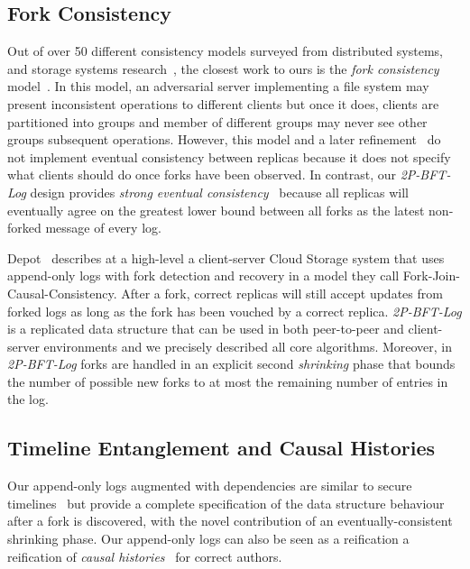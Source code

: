 \documentclass[9pt, oneside]{article}   	%
\begin{document}
\subsection{Fork Consistency}

Out of over 50 different consistency models surveyed from distributed systems, and storage systems research~\cite{viotti2016consistency-db-survey}, the closest work to ours is the \textit{fork consistency} model~\cite{mazieres2002sfs-byzantine-storage}. In this model, an adversarial server implementing a file system may present inconsistent operations to different clients but once it does, clients are partitioned into groups and member of different groups may never see other groups subsequent operations. However, this model and a later refinement~\cite{li2007beyondonethirdbft} do not implement eventual consistency between replicas because it does not specify what clients should do once forks have been observed. In contrast, our \textit{2P-BFT-Log} design provides \textit{strong eventual consistency}~\cite{shapiro:hal-00932836} because all replicas will eventually agree on the greatest lower bound between all forks as the latest non-forked message of every log. 

Depot~\cite{mahajan2011depot} describes at a high-level a client-server Cloud Storage system that uses append-only logs with fork detection and recovery in a model they call Fork-Join-Causal-Consistency. After a fork, correct replicas will still accept updates from forked logs as long as the fork has been vouched by a correct replica. \textit{2P-BFT-Log} is a replicated data structure that can be used in both peer-to-peer and client-server environments and we precisely described all core algorithms.  Moreover, in \textit{2P-BFT-Log} forks are handled in an explicit second \textit{shrinking} phase that bounds the number of possible new forks to at most the remaining number of entries in the log.


\subsection{Timeline Entanglement and Causal Histories}

 Our append-only logs augmented with dependencies are similar to secure timelines~\cite{maniatis2002secure-timeline-entanglement} but provide a complete specification of the data structure behaviour after a fork is discovered, with the novel contribution of an eventually-consistent shrinking phase. Our append-only logs can also be seen as a reification a reification of \textit{causal histories}~\cite{schwarz1994detecting} for correct authors.
\end{document}
